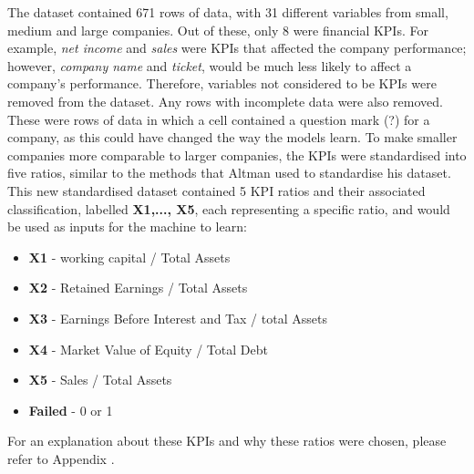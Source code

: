 \documentclass[11pt]{article}
\begin{document}
The dataset contained 671 rows of data, with 31 different variables from small, medium and large companies. Out of these, only 8 were financial KPIs. For example, \textit{net income} and \textit{sales} were KPIs that affected the company performance; however, \textit{company name} and \textit{ticket}, would be much less likely to affect a company's performance. Therefore, variables not considered to be KPIs were removed from the dataset. Any rows with incomplete data were also removed. These were rows of data in which a cell contained a question mark (?) for a company, as this could have changed the way the models learn. To make smaller companies more comparable to larger companies, the KPIs were standardised into five ratios, similar to the methods that Altman used to standardise his dataset. This new standardised dataset contained 5 KPI ratios and their associated classification, labelled \textbf{X1,..., X5}, each representing a specific ratio, and would be used as inputs for the machine to learn:
\begin{center}
	\begin{minipage}{.6\textwidth}
		\begin{itemize}
			\item[] \textbf{X1} - working capital / Total Assets
			\item[] \textbf{X2} - Retained Earnings / Total Assets
			\item[] \textbf{X3} - Earnings Before Interest and Tax / total Assets
			\item[] \textbf{X4} - Market Value of Equity / Total Debt
			\item[] \textbf{X5} - Sales / Total Assets
			\item[] \textbf{Failed} - 0 or 1
		\end{itemize}
	\end{minipage}
\end{center}
For an explanation about these KPIs and why these ratios were chosen, please refer to Appendix \cite{?}.
\end{document}
